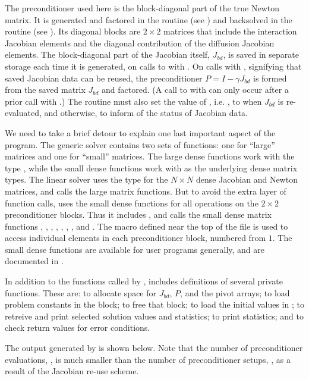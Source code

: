 The preconditioner used here is the block-diagonal part of the true Newton
matrix.  It is generated and factored in the  routine 
(see ) and backsolved in the  routine 
(see ). Its diagonal blocks are $2 \times 2$
matrices that include the interaction Jacobian elements and the diagonal
contribution of the diffusion Jacobian elements.  The block-diagonal part of
the Jacobian itself, $J_{bd}$, is saved in separate storage each time it is
generated, on calls to  with .
On calls with , signifying that saved Jacobian data
can be reused, the preconditioner $P = I - \gamma J_{bd}$ is formed from the
saved matrix $J_{bd}$ and factored.  (A call to  with
 can only occur after a prior call with
.)  The  routine must also set the value
of , i.e. , to  when $J_{bd}$ is re-evaluated,
and  otherwise, to inform {\cvspgmr} of the status of Jacobian data.

We need to take a brief detour to explain one last important aspect of
the  program.  The generic {\dense} solver contains two
sets of functions: one for ``large'' matrices and one for ``small''
matrices.  The large dense functions work with the type ,
while the small dense functions work with  as the
underlying dense matrix types.  The {\cvdense} linear solver uses the
type  for the $N \times N$ dense Jacobian and Newton
matrices, and calls the large matrix functions.  But to avoid the
extra layer of function calls,  uses the small dense
functions for all operations on the $2 \times 2$ preconditioner blocks.  
Thus it includes , and calls the small dense matrix
functions , , , , 
, , , and .  The macro
 defined near the top of the file is used to access
individual elements in each preconditioner block, numbered from $1$.
The small dense functions are available for {\cvode} user programs
generally, and are documented in .

In addition to the functions called by {\cvode},  includes
definitions of several private functions.  These are: 
to allocate space for $J_{bd}$, $P$, and the pivot arrays; 
to load problem constants in the  block;  to free
that block;  to load the initial values in ; 
 to retreive and print selected solution values and
statistics;  to print statistics; and 
to check return values for error conditions.

The output generated by  is shown below.  Note that the
number of preconditioner evaluations, , is much smaller than
the number of preconditioner setups, , as a result of the
Jacobian re-use scheme.


